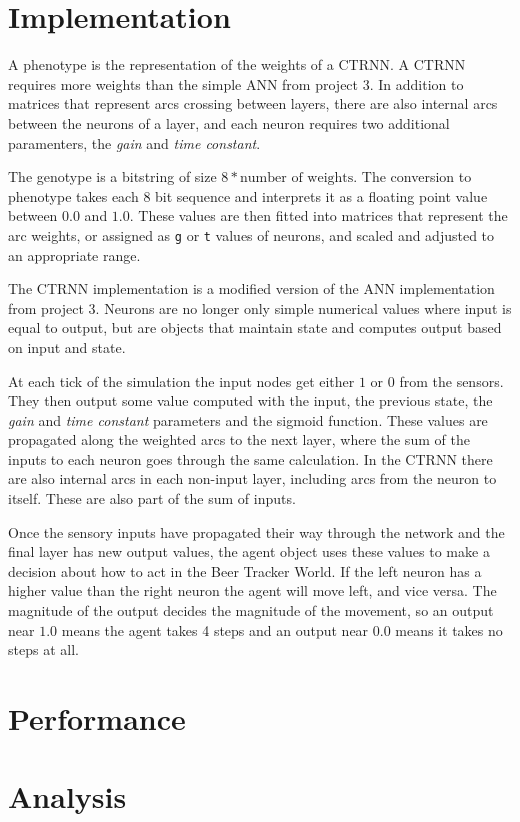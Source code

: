 \documentclass[twoside]{article}
\begin{document}
\begin{multicols}{2} %

    \section{Implementation}
    A phenotype is the representation of the weights of a CTRNN.
    A CTRNN requires more weights than the simple ANN from project 3.
    In addition to matrices that represent arcs crossing between layers,
    there are also internal arcs between the neurons of a layer,
    and each neuron requires two additional paramenters, the \textit{gain} and \textit{time constant}.

    The genotype is a bitstring of size $8 * \text{number of weights}$.
    The conversion to phenotype takes each 8 bit sequence and interprets it as a floating point value between $0.0$ and $1.0$.
    These values are then fitted into matrices that represent the arc weights,
    or assigned as \texttt{g} or \texttt{t} values of neurons,
    and scaled and adjusted to an appropriate range.

    The CTRNN implementation is a modified version of the ANN implementation from project 3.
    Neurons are no longer only simple numerical values where input is equal to output,
    but are objects that maintain state and computes output based on input and state.

    At each tick of the simulation the input nodes get either $1$ or $0$ from the sensors.
    They then output some value computed with the input, the previous state, the \textit{gain} and \textit{time constant} parameters and the sigmoid function.
    These values are propagated along the weighted arcs to the next layer,
    where the sum of the inputs to each neuron goes through the same calculation.
    In the CTRNN there are also internal arcs in each non-input layer,
    including arcs from the neuron to itself.
    These are also part of the sum of inputs.

    Once the sensory inputs have propagated their way through the network and the final layer has new output values,
    the agent object uses these values to make a decision about how to act in the Beer Tracker World.
    If the left neuron has a higher value than the right neuron the agent will move left, and vice versa.
    The magnitude of the output decides the magnitude of the movement,
    so an output near $1.0$ means the agent takes 4 steps and an output near $0.0$ means it takes no steps at all.

    \section{Performance}

    \section{Analysis}

\end{multicols}

%
%
\end{document}
